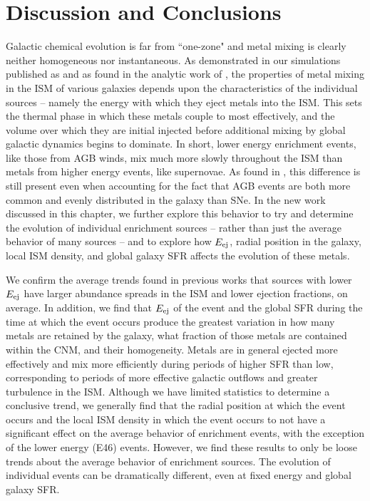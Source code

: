 \section{Discussion and Conclusions}
\label{ch4:sec:discussion conclusion}

Galactic chemical evolution is far from ``one-zone" and metal mixing is clearly neither homogeneous nor instantaneous. As demonstrated in our simulations published as \cite{Emerick2018b} and as found in the analytic work of \cite{KrumholzTing2018}, the properties of metal mixing in the ISM of various galaxies depends upon the characteristics of the individual sources -- namely the energy with which they eject metals into the ISM. This sets the thermal phase in which these metals couple to most effectively, and the volume over which they are initial injected before additional mixing by global galactic dynamics begins to dominate. In short, lower energy enrichment events, like those from AGB winds, mix much more slowly throughout the ISM than metals from higher energy events, like supernovae. As found in \cite{Emerick2018b}, this difference is still present even when accounting for the fact that AGB events are both more common and evenly distributed in the galaxy than SNe. In the new work discussed in this chapter, we further explore this behavior to try and determine the evolution of individual enrichment sources -- rather than just the average behavior of many sources -- and to explore how $E_{\rm ej}$, radial position in the galaxy, local ISM density, and global galaxy SFR affects the evolution of these metals.

We confirm the average trends found in previous works that sources with lower $E_{\rm ej}$ have larger abundance spreads in the ISM and lower ejection fractions, on average. In addition, we find that $E_{\rm ej}$ of the event and the global SFR during the time at which the event occurs produce the greatest variation in how many metals are retained by the galaxy, what fraction of those metals are contained within the CNM, and their homogeneity. Metals are in general ejected more effectively and mix more efficiently during periods of higher SFR than low, corresponding to periods of more effective galactic outflows and greater turbulence in the ISM. Although we have limited statistics to determine a conclusive trend, we generally find that the radial position at which the event occurs and the local ISM density in which the event occurs to not have a significant effect on the average behavior of enrichment events, with the exception of the lower energy (E46) events. However, we find these results to only be loose trends about the average behavior of enrichment sources. The evolution of individual events can be dramatically different, even at fixed energy and global galaxy SFR.

